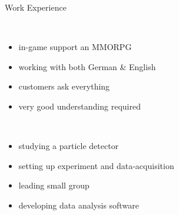 \begin{frame}[t]{Work Experience}\centering\vspace*{5mm}
%
  \begin{minipage}[c][.8\textheight][t]{.45\textwidth}\centering
    \\[4ex]
    \vspace*{5ex}
    \begin{itemize}\itemspace{2ex}
      \item in-game support an MMORPG
      \item working with both German \& English
      \item customers ask everything
      \item very good understanding required
    \end{itemize}
  \end{minipage}
%
  \begin{minipage}[c][.8\textheight][t]{.45\textwidth}\centering
    \\[2ex]
    \vspace*{2ex}
    \begin{itemize}\itemspace{2ex}
      \item studying a particle detector
      \item setting up experiment and data-acquisition
      \item leading small group
      \item developing data analysis software
    \end{itemize}
  \end{minipage}
%
\end{frame}
